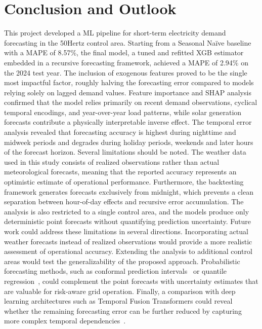 \section{Conclusion and Outlook}
\label{sec:conclusion_outlook}
This project developed a \ac{ML} pipeline for short-term electricity demand forecasting in the 50Hertz control area. Starting from a Seasonal Na\"{i}ve baseline with a MAPE of 8.57\%, the final model, a tuned and refitted \acs{XGB} estimator embedded in a recursive forecasting framework, achieved a MAPE of 2.94\% on the 2024 test year. The inclusion of exogenous features proved to be the single most impactful factor, roughly halving the forecasting error compared to models relying solely on lagged demand values. Feature importance and \ac{SHAP} analysis confirmed that the model relies primarily on recent demand observations, cyclical temporal encodings, and year-over-year load patterns, while solar generation forecasts contribute a physically interpretable inverse effect. The temporal error analysis revealed that forecasting accuracy is highest during nighttime and midweek periods and degrades during holiday periods, weekends and later hours of the forecast horizon. Several limitations should be noted. The weather data used in this study consists of realized observations rather than actual meteorological forecasts, meaning that the reported accuracy represents an optimistic estimate of operational performance. Furthermore, the backtesting framework generates forecasts exclusively from midnight, which prevents a clean separation between hour-of-day effects and recursive error accumulation. The analysis is also restricted to a single control area, and the models produce only deterministic point forecasts without quantifying prediction uncertainty. Future work could address these limitations in several directions. Incorporating actual weather forecasts instead of realized observations would provide a more realistic assessment of operational accuracy. Extending the analysis to additional control areas would test the generalizability of the proposed approach. Probabilistic forecasting methods, such as conformal prediction intervals~\cite{zaffran_2022_adaptive} or quantile regression~\cite{hong_2016_probabilistic}, could complement the point forecasts with uncertainty estimates that are valuable for risk-aware grid operation. Finally, a comparison with deep learning architectures such as Temporal Fusion Transformers could reveal whether the remaining forecasting error can be further reduced by capturing more complex temporal dependencies~\cite{lim_2021_temporal}.